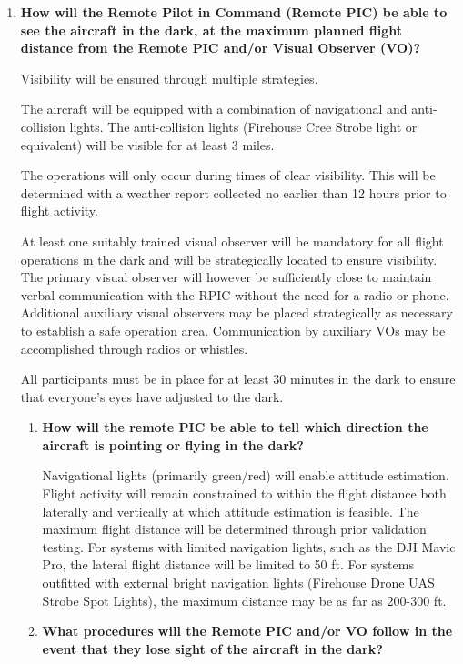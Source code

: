 \documentclass[
]{book}
\begin{document}
\begin{enumerate}
\def\labelenumi{\arabic{enumi}.}
\item
  \textbf{How will the Remote Pilot in Command (Remote PIC) be able to see the aircraft in the dark, at the maximum planned flight distance from the Remote PIC and/or Visual Observer (VO)?}

  Visibility will be ensured through multiple strategies.

  The aircraft will be equipped with a combination of navigational and anti-collision lights. The anti-collision lights (Firehouse Cree Strobe light or equivalent) will be visible for at least 3 miles.

  The operations will only occur during times of clear visibility. This will be determined with a weather report collected no earlier than 12 hours prior to flight activity.

  At least one suitably trained visual observer will be mandatory for all flight operations in the dark and will be strategically located to ensure visibility. The primary visual observer will however be sufficiently close to maintain verbal communication with the RPIC without the need for a radio or phone. Additional auxiliary visual observers may be placed strategically as necessary to establish a safe operation area. Communication by auxiliary VOs may be accomplished through radios or whistles.

  All participants must be in place for at least 30 minutes in the dark to ensure that everyone's eyes have adjusted to the dark.

  \begin{enumerate}
  \def\labelenumii{\arabic{enumii}.}
  \item
    \textbf{How will the remote PIC be able to tell which direction the aircraft is pointing or flying in the dark?}

    Navigational lights (primarily green/red) will enable attitude estimation. Flight activity will remain constrained to within the flight distance both laterally and vertically at which attitude estimation is feasible. The maximum flight distance will be determined through prior validation testing. For systems with limited navigation lights, such as the DJI Mavic Pro, the lateral flight distance will be limited to 50 ft. For systems outfitted with external bright navigation lights (Firehouse Drone UAS Strobe Spot Lights), the maximum distance may be as far as 200-300 ft.
  \item
    \textbf{What procedures will the Remote PIC and/or VO follow in the event that they lose sight of the aircraft in the dark?}


\end{enumerate}
\end{enumerate}
\end{document}
